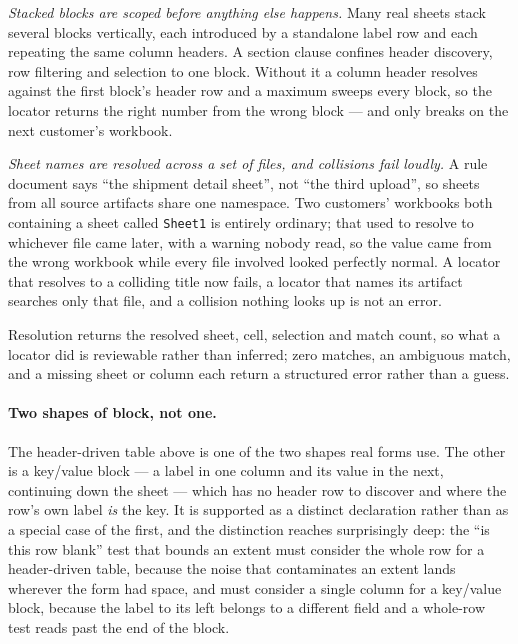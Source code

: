\emph{Stacked blocks are scoped before anything else happens.} Many real sheets stack
several blocks vertically, each introduced by a standalone label row and each repeating the
same column headers. A section clause confines header discovery, row filtering and
selection to one block. Without it a column header resolves against the first block's
header row and a maximum sweeps every block, so the locator returns the right number from
the wrong block --- and only breaks on the next customer's workbook.

\emph{Sheet names are resolved across a set of files, and collisions fail loudly.} A rule
document says ``the shipment detail sheet'', not ``the third upload'', so sheets from all
source artifacts share one namespace. Two customers' workbooks both containing a sheet
called \texttt{Sheet1} is entirely ordinary; that used to resolve to whichever file came
later, with a warning nobody read, so the value came from the wrong workbook while every
file involved looked perfectly normal. A locator that resolves to a colliding title now
fails, a locator that names its artifact searches only that file, and a collision nothing
looks up is not an error.

Resolution returns the resolved sheet, cell, selection and match count, so what a locator
did is reviewable rather than inferred; zero matches, an ambiguous match, and a missing
sheet or column each return a structured error rather than a guess.

\paragraph{Two shapes of block, not one.}
The header-driven table above is one of the two shapes real forms use. The other is a
key/value block --- a label in one column and its value in the next, continuing down the
sheet --- which has no header row to discover and where the row's own label \emph{is} the
key. It is supported as a distinct declaration rather than as a special case of the first,
and the distinction reaches surprisingly deep: the ``is this row blank'' test that bounds an
extent must consider the whole row for a header-driven table, because the noise that
contaminates an extent lands wherever the form had space, and must consider a single column
for a key/value block, because the label to its left belongs to a different field and a
whole-row test reads past the end of the block.


